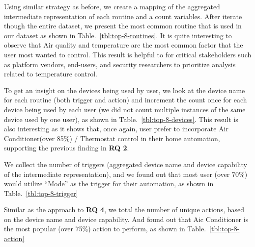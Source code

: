 

Using similar strategy as before, we create a mapping of the aggregated intermediate representation of each routine and a count variables. After iterate though the entire dataset, we present the most common routine that is used in our dataset as shown in Table.~\ref{tbl:top-8-routines}. It is quite interesting to observe that Air quality and temperature are the most common factor that the user most wanted to control. This result is helpful to for critical stakeholders such as platform vendors, end-users, and security researchers to prioritize analysis related to temperature control.



To get an insight on the devices being used by user, we look at the device name for each routine (both trigger and action) and increment the count once for each device being used by each user (we did not count multiple instances of the same device used by one user), as shown in Table.~\ref{tbl:top-8-devices}. This result is also interesting as it shows that, once again, user prefer to incorporate Air Conditioner(over 85\%) / Thermostat control in their home automation, supporting the previous finding in \textbf{RQ 2}.



We collect the number of triggers (aggregated device name and device capability of the intermediate representation), and we found out that most user (over 70\%) would utilize ``Mode'' as the trigger for their automation, as shown in Table.~\ref{tbl:top-8-trigger}



Similar as the approach to \textbf{RQ 4}, we total the number of unique actions, based on the device name and device capability. And found out that Aic Conditioner is the most popular (over 75\%) action to perform, as shown in Table.~\ref{tbl:top-8-action}



